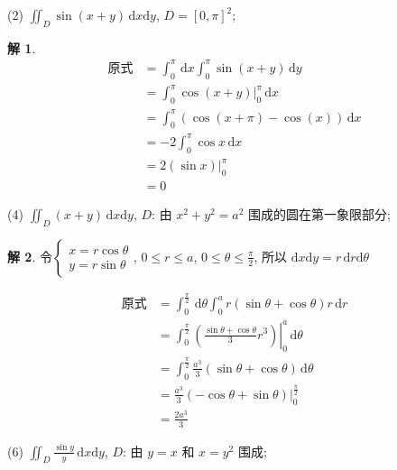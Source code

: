 \documentclass[a4paper,12pt]{article}
\theoremstyle{definition}
\newtheorem*{sol}{解}
\begin{document}
(2) $\displaystyle\iint_{D} \sin(x+y)\,\mathrm{d}x\mathrm{d}y$, $\displaystyle D=[0,\pi]^2$;
\begin{sol}
    \begin{align*}
        \text{原式}
         & =\int_0^{\pi}\,\mathrm{d}x\int_0^{\pi}\sin(x+y)\,\mathrm{d}y \\
         & =\int_0^{\pi}\left.\cos(x+y)\right|_0^{\pi}\,\mathrm{d}x     \\
         & =\int_0^{\pi}(\cos(x+\pi)-\cos(x))\,\mathrm{d}x              \\
         & =-2\int_0^{\pi}\cos x\,\mathrm{d}x                           \\
         & =2\left.(\sin x)\right|_0^{\pi}                              \\
         & =0
    \end{align*}
\end{sol}
(4) $\displaystyle\iint_{D} (x+y)\,\mathrm{d}x\mathrm{d}y$, $\displaystyle D$: 由 $\displaystyle x^2+y^2=a^2$ 围成的圆在第一象限部分;
\begin{sol}
    令$\begin{cases}
            x=r\cos\theta \\
            y=r\sin\theta
        \end{cases}$, $0\leq r\leq a$, $0\leq\theta\leq\frac{\pi}{2}$, 所以 $\mathrm{d}x\mathrm{d}y=r\,\mathrm{d}r\mathrm{d}\theta$

    \begin{align*}
        \text{原式}
         & =\int_0^{\frac{\pi}{2}}\,\mathrm{d}\theta\int_0^a r(\sin\theta+\cos\theta)r\,\mathrm{d}r       \\
         & =\int_0^{\frac{\pi}{2}}\left.(\frac{\sin\theta+\cos\theta}{3}r^3)\right|_0^a\,\mathrm{d}\theta \\
         & =\int_0^{\frac{\pi}{2}}\frac{a^3}{3}(\sin\theta+\cos\theta)\,\mathrm{d}\theta                  \\
         & =\frac{a^3}{3}\left.(-\cos\theta+\sin\theta)\right|_0^{\frac{\pi}{2}}                          \\
         & =\frac{2a^3}{3}
    \end{align*}
\end{sol}
(6) $\displaystyle \iint_{D} \frac{\sin y}{y}\,\mathrm{d}x\mathrm{d}y$, $\displaystyle D$: 由 $\displaystyle y=x$ 和 $\displaystyle x=y^2$ 围成;
\end{document}
